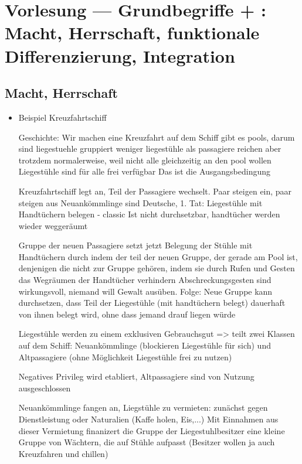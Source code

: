 \section{Vorlesung  --- Grundbegriffe  + : Macht, Herrschaft, funktionale Differenzierung, Integration}

\subsection{Macht, Herrschaft}
\begin{itemize}
	\item
		Beispiel Kreuzfahrtschiff

		Geschichte:
		Wir machen eine Kreuzfahrt
		auf dem Schiff gibt es pools, darum sind liegestuehle gruppiert
		weniger liegestühle als passagiere
		reichen aber trotzdem normalerweise, weil nicht alle gleichzeitig an den pool wollen
		Liegestühle sind für alle frei verfügbar
		Das ist die Ausgangsbedingung

		Kreuzfahrtschiff legt an, Teil der Passagiere wechselt. Paar steigen ein, paar steigen aus
		Neuankömmlinge sind Deutsche, 1. Tat: Liegestühle mit Handtüchern belegen - classic
		Ist nicht durchsetzbar, handtücher werden wieder weggeräumt

		Gruppe der neuen Passagiere setzt jetzt Belegung der Stühle mit Handtüchern durch indem der teil der neuen Gruppe, der gerade am Pool ist, denjenigen die nicht zur Gruppe gehören, indem sie durch Rufen und Gesten das Wegräumen der Handtücher verhindern
		Abschreckungsgesten sind wirkungsvoll, niemand will Gewalt ausüben.
		Folge: Neue Gruppe kann durchsetzen, dass Teil der Liegestühle (mit handtüchern belegt) dauerhaft von ihnen belegt wird, ohne dass jemand drauf liegen würde

		Liegestühle werden zu einem exklusiven Gebrauchsgut => teilt zwei Klassen auf dem Schiff: Neuankömmlinge (blockieren Liegestühle für sich) und Altpassagiere (ohne Möglichkeit Liegestühle frei zu nutzen)

		Negatives Privileg wird etabliert, Altpassagiere sind von Nutzung ausgeschlossen

		Neuankömmlinge fangen an, Liegstühle zu vermieten: zunächst gegen Dienstleistung oder Naturalien (Kaffe holen, Eis,...)
		Mit Einnahmen aus dieser Vermietung finanizert die Gruppe der Liegestuhlbesitzer eine kleine Gruppe von Wächtern, die auf Stühle aufpasst (Besitzer wollen ja auch Kreuzfahren und chillen)


\end{itemize}
